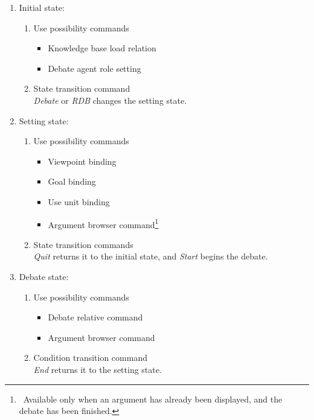 \begin{enumerate}
\item Initial state:

\begin{enumerate}
\item Use possibility commands
\begin{itemize}
\item Knowledge base load relation
\item Debate agent role setting
\end{itemize}
\item State transition command\\
{\sl Debate} or {\sl RDB} changes the setting state.
\end{enumerate}

\item Setting state: 

\begin{enumerate}
\item Use possibility commands
\begin{itemize}
\item Viewpoint binding
\item Goal binding
\item Use unit binding
\item Argument browser command\footnote{\ Available only when an
    argument has already been displayed, and the debate has been finished.}
\end{itemize}
 
\item State transition commands\\
{\sl Quit} returns it to the initial state, and {\sl Start} begins the debate.
\end{enumerate}

\item Debate state:

\begin{enumerate}
\item Use possibility commands
\begin{itemize}
\item Debate relative command
\item Argument browser command
\end{itemize}
\item Condition transition command\\
{\sl End} returns it to the setting state.
\end{enumerate}

\end{enumerate}

